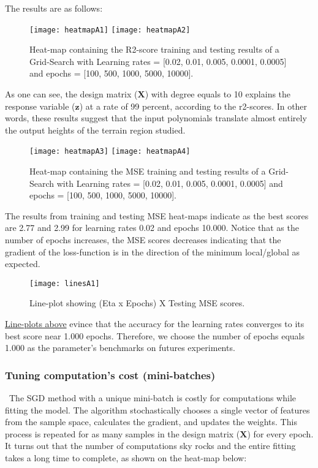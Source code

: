 The results are as follows:

\begin{figure}[H]
\label{fig:figA1}
\centering
\texttt{[image: heatmapA1]}
\texttt{[image: heatmapA2]}
\caption{Heat-map containing the R2-score training and testing results of a Grid-Search with Learning rates = [0.02, 0.01, 0.005, 0.0001, 0.0005] and epochs = [100, 500, 1000, 5000, 10000].}
\end{figure}

As one can see, the design matrix ($\boldsymbol{X}$) with degree equals to 10 explains the response variable ($\boldsymbol{z}$) at a rate of 99 percent, according to the r2-scores. In other words, these results suggest that the input polynomials translate almost entirely the output heights of the terrain region studied.

\begin{figure}[H]
\label{fig:figA2}
\centering
\texttt{[image: heatmapA3]}
\texttt{[image: heatmapA4]}
\caption{Heat-map containing the MSE training and testing results of a Grid-Search with Learning rates = [0.02, 0.01, 0.005, 0.0001, 0.0005] and epochs = [100, 500, 1000, 5000, 10000]. }
\end{figure}

The results from training and testing MSE heat-maps indicate as the best scores are 2.77 and 2.99 for learning rates 0.02 and epochs 10.000. Notice that as the number of epochs increases, the MSE scores decreases indicating that the gradient of the loss-function is in the direction of the minimum local/global as expected. 

\begin{figure}[H]
\label{fig:figA3}
\centering
\texttt{[image: linesA1]}
\caption{Line-plot showing (Eta x Epochs) X Testing MSE scores. }
\end{figure}

\hyperref[fig:figA3]{Line-plots above} evince that the accuracy for the learning rates converges to its best score near 1.000 epochs. Therefore, we choose the number of epochs equals 1.000 as the parameter's benchmarks on futures experiments.

\subsubsection{Tuning computation's cost (mini-batches)}
\label{chap:Tuning computation's cost (mini-batches)}

\quad \, The SGD method with a unique mini-batch is costly for computations while fitting the model. The algorithm stochastically chooses a single vector of features from the sample space, calculates the gradient, and updates the weights. This process is repeated for as many samples in the design matrix ($\boldsymbol{X}$) for every epoch. It turns out that the number of computations sky rocks and the entire fitting takes a long time to complete, as shown on the heat-map below:


